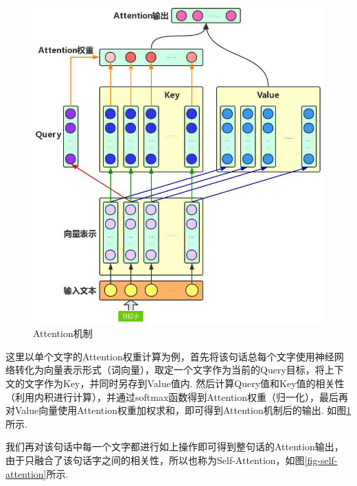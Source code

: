 \documentclass[12pt, a4paper, oneside]{ctexart}
\numberwithin{equation}{section}  %
\begin{document}
\begin{figure} %
    \centering
    \includegraphics[scale=0.4]{../NLP大作业note.figure/Attention机制.jpg}
    \caption{Attention机制}
    \label{fig-attention}
\end{figure}
这里以单个文字的Attention权重计算为例，首先将该句话总每个文字使用神经网络转化为向量表示形式（词向量），取定一个文字作为当前的Query目标，将上下文的文字作为Key，并同时另存到Value值内.
然后计算Query值和Key值的相关性（利用内积进行计算），并通过softmax函数得到Attention权重（归一化），最后再对Value向量使用Attention权重加权求和，即可得到Attention机制后的输出. 如图\ref{fig-attention}所示.

我们再对该句话中每一个文字都进行如上操作即可得到整句话的Attention输出，由于只融合了该句话字之间的相关性，所以也称为Self-Attention，如图\ref{fig-self-attention}所示.
\end{document}
